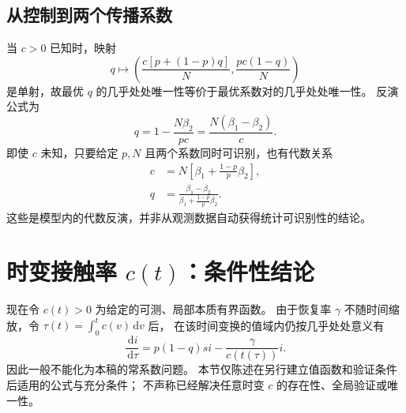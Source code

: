 \documentclass[11pt,a4paper,UTF8]{ctexart}
\theoremstyle{definition}
\newcommand{\dd}{\,\mathrm d}
\begin{document}
\subsection{从控制到两个传播系数}
当 $c>0$ 已知时，映射
\begin{equation}
q\mapsto\left(\frac{c[p+(1-p)q]}N,\frac{pc(1-q)}N\right)
\label{eq:q-to-betas}
\end{equation}
是单射，故最优 $q$ 的几乎处处唯一性等价于最优系数对的几乎处处唯一性。
反演公式为
\begin{equation}
q=1-\frac{N\beta_2}{pc}=\frac{N(\beta_1-\beta_2)}c.
\label{eq:q-inversion-known-c}
\end{equation}
即使 $c$ 未知，只要给定 $p,N$ 且两个系数同时可识别，也有代数关系
\begin{align}
c&=N\left[\beta_1+\frac{1-p}{p}\beta_2\right],\label{eq:c-inversion}\\
q&=\frac{\beta_1-\beta_2}{\beta_1+\frac{1-p}{p}\beta_2}.\label{eq:q-inversion}
\end{align}
这些是模型内的代数反演，并非从观测数据自动获得统计可识别性的结论。

\ifdefined\TheoryOnly\else
\section{\texorpdfstring{时变接触率 $c(t)$：条件性结论}{时变接触率：条件性结论}}
\label{sec:time-varying}
现在令 $c(t)>0$ 为给定的可测、局部本质有界函数。
由于恢复率 $\gamma$ 不随时间缩放，令 $\tau(t)=\int_0^t c(v)\dd v$ 后，
在该时间变换的值域内仍按几乎处处意义有
\[
\frac{\dd i}{\dd\tau}=p(1-q)si-\frac{\gamma}{c(t(\tau))}i.
\]
因此一般不能化为本稿的常系数问题。
本节仅陈述在另行建立值函数和验证条件后适用的公式与充分条件；
不声称已经解决任意时变 $c$ 的存在性、全局验证或唯一性。
\end{document}
